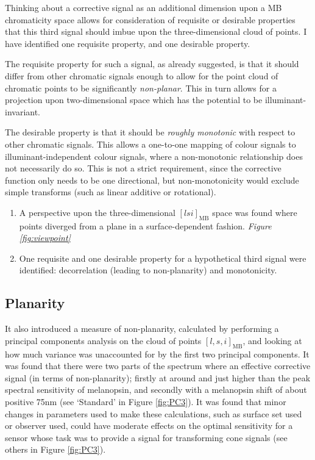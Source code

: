 Thinking about a corrective signal as an additional dimension upon a \gls{MB} chromaticity space allows for consideration of requisite or desirable properties that this third signal should imbue upon the three-dimensional cloud of points. I have identified one requisite property, and one desirable property. 

The requisite property for such a signal, as already suggested, is that it should differ from other chromatic signals enough to allow for the point cloud of chromatic points to be significantly \emph{non-planar}. This in turn allows for a projection upon two-dimensional space which has the potential to be illuminant-invariant.

The desirable property is that it should be \emph{roughly monotonic} with respect to other chromatic signals. This allows a one-to-one mapping of colour signals to illuminant-independent colour signals, where a non-monotonic relationship does not necessarily do so. This is not a strict requirement, since the corrective function only needs to be one directional, but non-monotonicity would exclude simple transforms (such as linear additive or rotational).

\begin{enumerate}
    \item A perspective upon the three-dimensional $[lsi]_{\text{MB}}$ space was found where points diverged from a plane in a surface-dependent fashion. \emph{Figure \ref{fig:viewpoint}}
    \item One requisite and one desirable property for a hypothetical third signal were identified: decorrelation (leading to non-planarity) and monotonicity. 
\end{enumerate}



\subsection{Planarity}

It also introduced a measure of non-planarity, calculated by performing a principal components analysis on the cloud of points $[l,s,i]_{\text{MB}}$, and looking at how much variance was unaccounted for by the first two principal components. It was found that there were two parts of the spectrum where an effective corrective signal (in terms of non-planarity); firstly at around and just higher than the peak spectral sensitivity of melanopsin, and secondly with a melanopsin shift of about positive 75nm (see `Standard' in Figure \ref{fig:PC3}). It was found that minor changes in parameters used to make these calculations, such as surface set used or observer used, could have moderate effects on the optimal sensitivity for a sensor whose task was to provide a signal for transforming cone signals (see others in Figure \ref{fig:PC3}).

